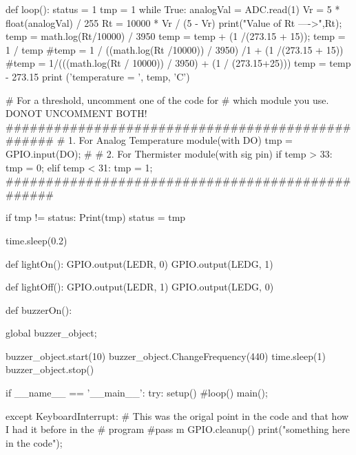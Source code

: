 	
	
	

def loop():
	status = 1
	tmp = 1
	while True:
		analogVal = ADC.read(1)
		Vr = 5 * float(analogVal) / 255
		Rt = 10000 * Vr / (5 - Vr)
		print("Value of Rt ---->",Rt);
		temp = math.log(Rt/10000) / 3950
		temp = temp + (1 /(273.15 + 15));
		temp = 1 / temp
		#temp = 1 / ((math.log(Rt /10000)) / 3950) /1  + (1 /(273.15 + 15))
		#temp = 1/(((math.log(Rt / 10000)) / 3950) + (1 / (273.15+25)))
		temp = temp - 273.15
		print ('temperature = ', temp, 'C')

		# For a threshold, uncomment one of the code for
		# which module you use. DONOT UNCOMMENT BOTH!
		#################################################
		# 1. For Analog Temperature module(with DO)
		tmp = GPIO.input(DO);
		# 
		# 2. For Thermister module(with sig pin)
		if temp > 33:
			tmp = 0;
		elif temp < 31:
			tmp = 1;
		#################################################

		if tmp != status:
			Print(tmp)
			status = tmp

		time.sleep(0.2)
		
def lightOn():
	GPIO.output(LEDR, 0)
	GPIO.output(LEDG, 1)
	
def lightOff():
	GPIO.output(LEDR, 1)
	GPIO.output(LEDG, 0)
	
def buzzerOn():
	
	global buzzer_object;
		
	buzzer_object.start(10)
	buzzer_object.ChangeFrequency(440)
	time.sleep(1)
	buzzer_object.stop()
	


if __name__ == '__main__':
	try:
		setup()
		#loop()
		main();
		
		
	except KeyboardInterrupt: 
		# This was the origal point in the code and that how I had it before in the 
		# program
		#pass m
		GPIO.cleanup()
		print("something here in the code");    
		



